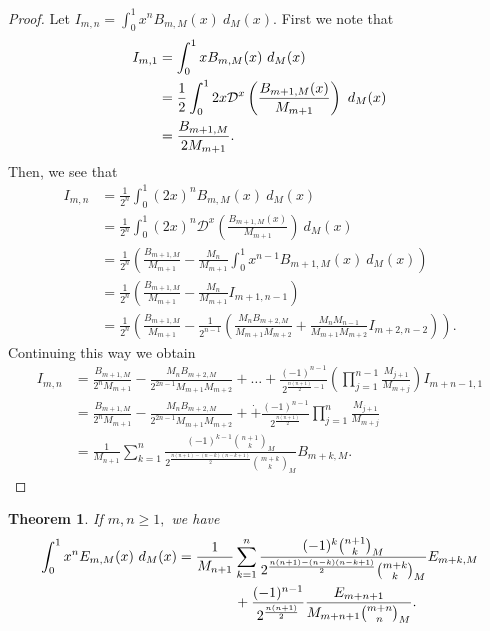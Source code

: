 \documentclass[12pt, a4paper]{article}
\newtheorem{theorem}{Theorem}[section]
\begin{document}
\begin{proof}
Let $I_{m,n} = \int_{0}^{1}x^nB_{m,M}(x)~d_M(x).$  First we note that
\begin{align*} \label{eq:BI}
I_{m,1} &= \int_{0}^{1}xB_{m,M}(x)~d_M(x)\notag\\ 
&= \frac{1}{2} \int_{0}^{1}2x\mathcal{D}^x\left(\frac{B_{m+1,M}(x)}{M_{m+1}}\right)~d_M(x)\notag\\
&= \frac{B_{m+1,M}}{2M_{m+1}}.
\end{align*}
Then, we see that
\begin{align*}
I_{m,n} &= \frac{1}{2^n}\int_{0}^{1}(2x)^nB_{m,M}(x)~d_M(x)\\
&= \frac{1}{2^n}\int_{0}^{1}(2x)^n\mathcal{D}^x\left(\frac{B_{m+1,M}(x)}{M_{m+1}}\right)~d_M(x)\\
&= \frac{1}{2^n}\left(\frac{B_{m+1,M}}{M_{m+1}}-\frac{M_n}{M_{m+1}}\int_{0}^{1}x^{n-1}B_{m+1,M}(x)~d_M(x)\right)\\
&= \frac{1}{2^n}\left(\frac{B_{m+1,M}}{M_{m+1}}-\frac{M_n}{M_{m+1}}I_{m+1,n-1}\right)\\
&= \frac{1}{2^n}\left(\frac{B_{m+1,M}}{M_{m+1}}-\frac{1}{2^{n-1}}\left(\frac{M_nB_{m+2,M}}{M_{m+1}M_{m+2}}+\frac{M_{n}M_{n-1}}{M_{m+1}M_{m+2}}I_{m+2,n-2}\right)\right).
\end{align*}
Continuing this way we obtain
\begin{align*}
I_{m,n} &= \frac{B_{m+1,M}}{2^nM_{m+1}}-\frac{M_nB_{m+2,M}}{2^{2n-1}M_{m+1}M_{m+2}}+\dots+\frac{(-1)^{n-1}}{2^{\frac{n(n+1)}{2}-1}}\left(\prod_{j=1}^{n-1}\frac{M_{j+1}}{M_{m+j}}\right)I_{m+n-1,1}\\
&= \frac{B_{m+1,M}}{2^nM_{m+1}}-\frac{M_nB_{m+2,M}}{2^{2n-1}M_{m+1}M_{m+2}}+\dot+\frac{(-1)^{n-1}}{2^{\frac{n(n+1)}{2}}}\prod_{j=1}^{n}\frac{M_{j+1}}{M_{m+j}}\\
&= \frac{1}{M_{n+1}}\sum_{k=1}^{n}\frac{(-1)^{k-1}\binom{n+1}{k}_M}{2^{\frac{n(n+1)-(n-k)(n-k+1)}{2}}\binom{m+k}{k}_M}B_{m+k,M}.
\end{align*}
\end{proof}
\begin{theorem}
If $m,n \geq 1,$ we have
\begin{align*}
\int_{0}^{1}x^nE_{m,M}(x)~d_M(x) = \frac{1}{M_{n+1}}&\sum_{k=1}^{n}\frac{(-1)^{k}\binom{n+1}{k}_M}{2^{\frac{n(n+1)-(n-k)(n-k+1)}{2}}\binom{m+k}{k}_M}E_{m+k,M}\notag\\&
+\frac{(-1)^{n-1}}{2^{\frac{n(n+1)}{2}}}\frac{E_{m+n+1}}{M_{m+n+1}\binom{m+n}{n}_M}.
\end{align*}
\end{theorem}
\end{document}
